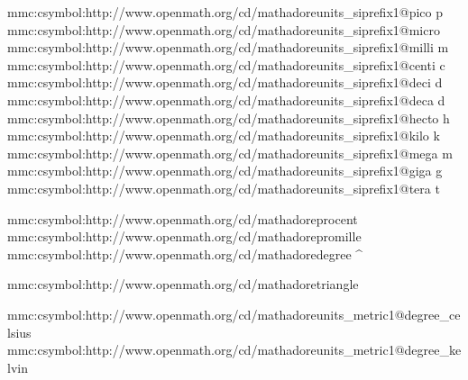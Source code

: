 \startsetups mmc:csymbol:http://www.openmath.org/cd/mathadore units_siprefix1@pico  {\mr p}\getXMLstackdata\plustwo\stopsetups
\startsetups mmc:csymbol:http://www.openmath.org/cd/mathadore units_siprefix1@micro     \mu\getXMLstackdata\plustwo\stopsetups
\startsetups mmc:csymbol:http://www.openmath.org/cd/mathadore units_siprefix1@milli {\mr m}\getXMLstackdata\plustwo\stopsetups
\startsetups mmc:csymbol:http://www.openmath.org/cd/mathadore units_siprefix1@centi {\mr c}\getXMLstackdata\plustwo\stopsetups
\startsetups mmc:csymbol:http://www.openmath.org/cd/mathadore units_siprefix1@deci  {\mr d}\getXMLstackdata\plustwo\stopsetups
\startsetups mmc:csymbol:http://www.openmath.org/cd/mathadore units_siprefix1@deca  {\mr d}\getXMLstackdata\plustwo\stopsetups
\startsetups mmc:csymbol:http://www.openmath.org/cd/mathadore units_siprefix1@hecto {\mr h}\getXMLstackdata\plustwo\stopsetups
\startsetups mmc:csymbol:http://www.openmath.org/cd/mathadore units_siprefix1@kilo  {\mr k}\getXMLstackdata\plustwo\stopsetups
\startsetups mmc:csymbol:http://www.openmath.org/cd/mathadore units_siprefix1@mega  {\mr m}\getXMLstackdata\plustwo\stopsetups
\startsetups mmc:csymbol:http://www.openmath.org/cd/mathadore units_siprefix1@giga  {\mr g}\getXMLstackdata\plustwo\stopsetups
\startsetups mmc:csymbol:http://www.openmath.org/cd/mathadore units_siprefix1@tera  {\mr t}\getXMLstackdata\plustwo\stopsetups

\startsetups mmc:csymbol:http://www.openmath.org/cd/mathadore procent   \procent\stopsetups
\startsetups mmc:csymbol:http://www.openmath.org/cd/mathadore promille \promille\stopsetups
\startsetups mmc:csymbol:http://www.openmath.org/cd/mathadore degree      ^\circ\stopsetups


\startsetups mmc:csymbol:http://www.openmath.org/cd/mathadore triangle
    \Delta\,
\stopsetups


\startsetups mmc:csymbol:http://www.openmath.org/cd/mathadore units_metric1@degree_celsius
\stopsetups
\startsetups mmc:csymbol:http://www.openmath.org/cd/mathadore units_metric1@degree_kelvin
\stopsetups

